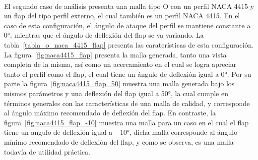\documentclass[letterpaper, openright, 12pt]{book}
\begin{document}
    \paragraph*{}
    El segundo caso de análisis presenta una malla tipo O con un perfil
    NACA 4415 y un flap del tipo perfil externo, el cual también es un
    perfil NACA 4415. En el caso de esta configuración, el ángulo de ataque
    del perfil se mantiene constante a $0\si{\degree}$, mientras que el ángulo
    de deflexión del flap se va variando. La tabla~\ref{tabla_o_naca_4415_flap}
    presenta las  caraterísticas de esta configuración. La
    figura~\ref{fig:naca4415_flap} presenta la malla generada, tanto una
    vista completa de la misma, así como un acercamiento en el cual se logra
    apreciar tanto el perfil como el flap, el cual tiene un ángulo de
    deflexión igual a 0\si{\degree}. Por su parte la
    figura~\ref{fig:naca4415_flap_50} muestra una malla generada bajo los
    mismos parámetros y una deflexión del flap igual a 50\si{\degree}, la
    cual cumple en términos generales con las características de una malla
    de calidad, y corresponde al ángulo máximo recomendado de deflexión del
    flap. En contraste, la figura~\ref{fig:naca4415_flap_-10} muestra
    una malla para un caso en el cual el flap tiene un angulo de deflexión
    igual a $-10\si{\degree}$, dicha malla corresponde al ángulo mínimo
    recomendado de deflexión del flap, y como se observa, es una malla todavía
    de utilidad práctica.
\end{document}
